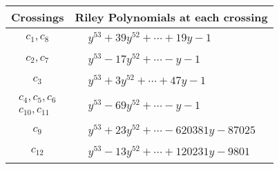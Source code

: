 \documentclass[1p]{elsarticle_modified}
\theoremstyle{definition}
\begin{document}
\begin{tabular}{m{50pt}|m{274pt}}
Crossings & \hspace{64pt}Riley Polynomials at each crossing \\
\hline $$\begin{aligned}c_{1},c_{8}\end{aligned}$$&$\begin{aligned}
&y^{53}+39 y^{52}+\cdots+19 y-1
\end{aligned}$\\
\hline $$\begin{aligned}c_{2},c_{7}\end{aligned}$$&$\begin{aligned}
&y^{53}-17 y^{52}+\cdots- y-1
\end{aligned}$\\
\hline $$\begin{aligned}c_{3}\end{aligned}$$&$\begin{aligned}
&y^{53}+3 y^{52}+\cdots+47 y-1
\end{aligned}$\\
\hline $$\begin{aligned}c_{4},c_{5},c_{6}\\c_{10},c_{11}\end{aligned}$$&$\begin{aligned}
&y^{53}-69 y^{52}+\cdots- y-1
\end{aligned}$\\
\hline $$\begin{aligned}c_{9}\end{aligned}$$&$\begin{aligned}
&y^{53}+23 y^{52}+\cdots-620381 y-87025
\end{aligned}$\\
\hline $$\begin{aligned}c_{12}\end{aligned}$$&$\begin{aligned}
&y^{53}-13 y^{52}+\cdots+120231 y-9801
\end{aligned}$\\
\hline
\end{tabular}
\vskip 2pc
\end{document}
